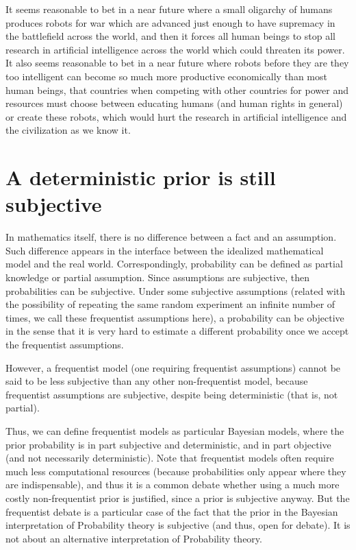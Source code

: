 \documentclass[11pt]{book}
\begin{document}
It seems reasonable to bet in a near future where a small oligarchy of
humans produces robots for war which are advanced just enough to have
supremacy in the battlefield across the world, and then it forces all
human beings to stop all research in artificial intelligence across the
world which could threaten its power. It also seems reasonable to bet in
a near future where robots before they are they too intelligent can
become so much more productive economically than most human beings, that
countries when competing with other countries for power and resources
must choose between educating humans (and human rights in general) or
create these robots, which would hurt the research in artificial
intelligence and the civilization as we know it.

\hypertarget{a-deterministic-prior-is-still-subjective}{%
\section{A deterministic prior is still
subjective}\label{a-deterministic-prior-is-still-subjective}}

In mathematics itself, there is no difference between a fact and an
assumption. Such difference appears in the interface between the
idealized mathematical model and the real world. Correspondingly,
probability can be defined as partial knowledge or partial assumption.
Since assumptions are subjective, then probabilities can be subjective.
Under some subjective assumptions (related with the possibility of
repeating the same random experiment an infinite number of times, we
call these frequentist assumptions here), a probability can be objective
in the sense that it is very hard to estimate a different probability
once we accept the frequentist assumptions.

However, a frequentist model (one requiring frequentist assumptions)
cannot be said to be less subjective than any other non-frequentist
model, because frequentist assumptions are subjective, despite being
deterministic (that is, not partial).

Thus, we can define frequentist models as particular Bayesian models,
where the prior probability is in part subjective and deterministic, and
in part objective (and not necessarily deterministic). Note that
frequentist models often require much less computational resources
(because probabilities only appear where they are indispensable), and
thus it is a common debate whether using a much more costly
non-frequentist prior is justified, since a prior is subjective anyway.
But the frequentist debate is a particular case of the fact that the
prior in the Bayesian interpretation of Probability theory is subjective
(and thus, open for debate). It is not about an alternative
interpretation of Probability theory.
\end{document}
